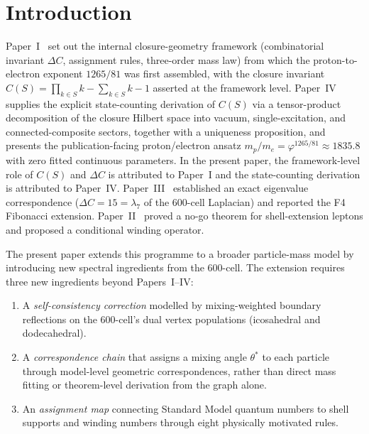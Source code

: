 \documentclass[12pt]{article}
\newcommand{\phig}{\varphi}
\begin{document}
\begin{abstract}
The paper separates exact computations on the 600-cell graph from framework postulates, structural assignment rules, and numerically established correspondences. It does not claim a first-principles derivation from the Standard Model, a complete dynamical theory, a unique derivation of all model identifications, an independent Born-rule derivation, or an explanation of the absolute mass scale.
\end{abstract}

\section{Introduction}\label{sec:intro}

Paper~I~\citep{SmartI} set out the internal closure-geometry framework (combinatorial invariant $\Delta C$, assignment rules, three-order mass law) from which the proton-to-electron exponent $1265/81$ was first assembled, with the closure invariant $C(S) = \prod_{k \in S} k - \sum_{k \in S} k - 1$ asserted at the framework level. Paper~IV~\citep{SmartIV} supplies the explicit state-counting derivation of $C(S)$ via a tensor-product decomposition of the closure Hilbert space into vacuum, single-excitation, and connected-composite sectors, together with a uniqueness proposition, and presents the publication-facing proton/electron ansatz $m_p/m_e = \phig^{1265/81} \approx 1835.8$ with zero fitted continuous parameters. In the present paper, the framework-level role of $C(S)$ and $\Delta C$ is attributed to Paper~I and the state-counting derivation is attributed to Paper~IV. Paper~III~\citep{SmartIII} established an exact eigenvalue correspondence ($\Delta C = 15 = \lambda_7$ of the 600-cell Laplacian) and reported the F4 Fibonacci extension. Paper~II~\citep{SmartII} proved a no-go theorem for shell-extension leptons and proposed a conditional winding operator.

The present paper extends this programme to a broader particle-mass model by introducing new spectral ingredients from the 600-cell. The extension requires three new ingredients beyond Papers~I--IV:

\begin{enumerate}
    \item A \textit{self-consistency correction} modelled by mixing-weighted boundary reflections on the 600-cell's dual vertex populations (icosahedral and dodecahedral).
    \item A \textit{correspondence chain} that assigns a mixing angle $\theta^*$ to each particle through model-level geometric correspondences, rather than direct mass fitting or theorem-level derivation from the graph alone.
    \item An \textit{assignment map} connecting Standard Model quantum numbers to shell supports and winding numbers through eight physically motivated rules.
\end{enumerate}
\end{document}
